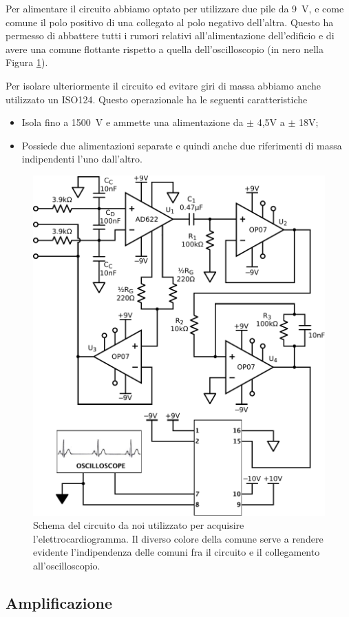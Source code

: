 Per alimentare il circuito abbiamo optato per utilizzare due pile da \SI{9}{\volt}, e come comune il polo positivo di una collegato al polo negativo dell'altra. Questo ha permesso di abbattere tutti i rumori relativi all'alimentazione dell'edificio e di avere una comune flottante rispetto a quella dell'oscilloscopio (in nero nella Figura \ref{cir7:elettro-cardiogramma}).

Per isolare ulteriormente il circuito ed evitare giri di massa abbiamo anche utilizzato un ISO124. Questo operazionale ha le seguenti caratteristiche
\begin{itemize}[noitemsep]
	\item Isola fino a \SI{1500}{\volt} e ammette una alimentazione da $\pm$ 4,5V a $\pm$ 18V;
	\item Possiede due alimentazioni separate e quindi anche due riferimenti di massa indipendenti l'uno dall'altro.
\end{itemize}

\begin{figure}[tpc]
\centering
\includegraphics[width=.6\textwidth]{../E07/latex/circuito.pdf}
\caption{Schema del circuito da noi utilizzato per acquisire l'elettrocardiogramma. Il diverso colore della comune serve a rendere evidente l'indipendenza delle comuni fra il circuito e il collegamento all'oscilloscopio.}
\label{cir7:elettro-cardiogramma}
\end{figure}

\subsection{Amplificazione}

